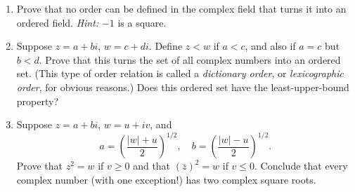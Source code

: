 \documentclass[12pt]{article}
\begin{document}
\begin{enumerate}
    \item Prove that no order can be defined in the complex field that turns it into an ordered field. \emph{Hint:} $-1$ is a square.

    \item Suppose $z = a + bi$, $w = c + di$. Define $z < w$ if $a < c$, and also if $a = c$ but $b < d$. Prove that this turns the set of all complex numbers into an ordered set. (This type of order relation is called a \emph{dictionary order}, or \emph{lexicographic order}, for obvious reasons.) Does this ordered set have the least-upper-bound property?

    \item Suppose $z = a + bi$, $w = u + iv$, and
    \[
        a = \left( \frac{|w| + u}{2} \right)^{1/2}, \quad b = \left( \frac{|w| - u}{2} \right)^{1/2}.
    \]
    Prove that $z^2 = w$ if $v \geq 0$ and that $(\bar{z})^2 = w$ if $v \leq 0$. Conclude that every complex number (with one exception!) has two complex square roots.
    
\end{enumerate}
\end{document}
